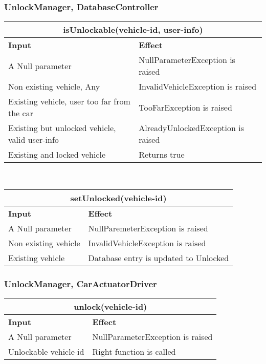 \subsubsection{UnlockManager, DatabaseController} 
\begin{tabular}{|p{5cm}|p{7cm}|}
\hline
\multicolumn{2}{|c|}{isUnlockable(vehicle-id, user-info)}\\
\hline
\textbf{Input} & \textbf{Effect}\\

\hline
A Null parameter & NullParameterException is raised \\

\hline
Non existing vehicle, Any & InvalidVehicleException is raised\\

\hline
Existing vehicle, user too far from the car & TooFarException is raised\\

\hline
Existing but unlocked vehicle, valid user-info & AlreadyUnlockedException is raised\\

\hline
Existing and locked vehicle & Returns true\\
\hline
\end{tabular}
\\
\begin{tabular}{|p{5cm}|p{7cm}|}
\hline
\multicolumn{2}{|c|}{setUnlocked(vehicle-id)}\\
\hline
\textbf{Input} & \textbf{Effect}\\

\hline
A Null parameter & NullParemeterException is raised \\

\hline
Non existing vehicle & InvalidVehicleException is raised\\

\hline
Existing vehicle & Database entry is updated to Unlocked \\
\hline
\end{tabular}

\subsubsection{UnlockManager, CarActuatorDriver} 
\begin{tabular}{|p{5cm}|p{7cm}|}
\hline
\multicolumn{2}{|c|}{unlock(vehicle-id)}\\
\hline
\textbf{Input} & \textbf{Effect}\\

\hline
A Null parameter & NullParameterException is raised \\

\hline
Unlockable vehicle-id & Right function is called\\
\hline
\end{tabular}

